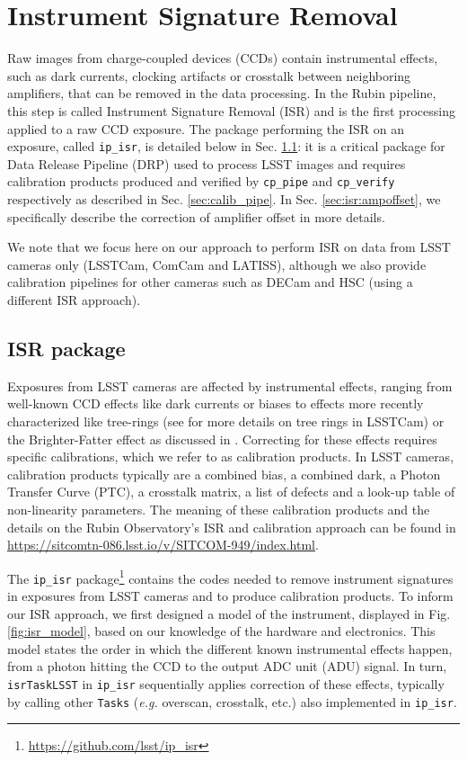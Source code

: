 \section{Instrument Signature Removal}
\label{sec:isr}

Raw images from charge-coupled devices (CCDs) contain instrumental effects, such as dark currents, clocking artifacts or crosstalk between neighboring amplifiers, that can be removed in the data processing.
In the Rubin pipeline, this step is called Instrument Signature Removal (ISR) and is the first processing applied to a raw CCD exposure.
The package performing the ISR on an exposure, called \texttt{ip\_isr}, is detailed below in Sec. \ref{sec:ip_isr}: it is a critical package for Data Release Pipeline (DRP) used to process LSST images and requires calibration products produced and verified by \texttt{cp\_pipe} and \texttt{cp\_verify} respectively as described in Sec. \ref{sec:calib_pipe}.
In Sec. \ref{sec:isr:ampoffset}, we specifically describe the correction of amplifier offset in more details.

We note that we focus here on our approach to perform ISR on data from LSST cameras only (LSSTCam, ComCam and LATISS), although we also provide calibration pipelines for other cameras such as DECam and HSC (using a different ISR approach).

\subsection{ISR package}
\label{sec:ip_isr}

Exposures from LSST cameras are affected by instrumental effects, ranging from well-known CCD effects like dark currents or biases to effects more recently characterized like tree-rings (see \cite{park_properties_2017,park_tree_2020,esteves_photometry_2023} for more details on tree rings in LSSTCam) or the Brighter-Fatter effect as discussed in \cite{broughton_2023}. Correcting for these effects requires specific calibrations, which we refer to as calibration products. In LSST cameras, calibration products typically are a combined bias, a combined dark, a Photon Transfer Curve (PTC), a crosstalk matrix, a list of defects and a look-up table of non-linearity parameters.
The meaning of these calibration products and the details on the Rubin Observatory's ISR and calibration approach can be found in \url{https://sitcomtn-086.lsst.io/v/SITCOM-949/index.html}.

The \texttt{ip\_isr} package\footnote{\url{https://github.com/lsst/ip_isr}} contains the codes needed to remove instrument signatures in exposures from LSST cameras and to produce calibration products.
To inform our ISR approach, we first designed a model of the instrument, displayed in Fig. \ref{fig:isr_model}, based on our knowledge of the hardware and electronics. This model states the order in which the different known instrumental effects happen, from a photon hitting the CCD to the output ADC unit (ADU) signal.
In turn, \texttt{isrTaskLSST} in \texttt{ip\_isr} sequentially applies correction of these effects, typically by calling other \texttt{Tasks} (\textit{e.g.} overscan, crosstalk, etc.) also implemented in \texttt{ip\_isr}.


